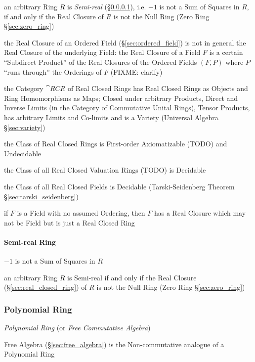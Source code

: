 an arbitrary Ring $R$ is \emph{Semi-real} (\S\ref{sec:semireal_ring}), i.e.
$-1$ is not a Sum of Squares in $R$, if and only if the Real Closure of $R$ is
not the Null Ring (Zero Ring \S\ref{sec:zero_ring})

the Real Closure of an Ordered Field (\S\ref{sec:ordered_field}) is not in
general the Real Closure of the underlying Field: the Real Closure of a Field
$F$ is a certain ``Subdirect Product'' of the Real Closures of the Ordered
Fields $(F,P)$ where $P$ ``runs through'' the Orderings of $F$ (FIXME: clarify)

the Category $\cat{RCR}$ of Real Closed Rings has Real Closed Rings as Objects
and Ring Homomorphisms as Maps; Closed under arbitrary Products, Direct and
Inverse Limits (in the Category of Commutative Unital Rings), Tensor Products,
has arbitrary Limits and Co-limits and is a Variety (Universal Algebra
\S\ref{sec:variety})

the Class of Real Closed Rings is First-order Axiomatizable (TODO) and
Undecidable

the Class of all Real Closed Valuation Rings (TODO) is Decidable

the Class of all Real Closed Fields is Decidable (\fist Tarski-Seidenberg
Theorem \S\ref{sec:tarski_seidenberg})

if $F$ is a Field with no assumed Ordering, then $F$ has a Real Closure which
may not be Field but is just a Real Closed Ring



\paragraph{Semi-real Ring}\label{sec:semireal_ring}\hfill

$-1$ is not a Sum of Squares in $R$

an arbitrary Ring $R$ is Semi-real if and only if the Real Closure
(\S\ref{sec:real_closed_ring}) of $R$ is not the Null Ring (Zero Ring
\S\ref{sec:zero_ring})



\subsubsection{Polynomial Ring}\label{sec:polynomial_ring}

\emph{Polynomial Ring} (or \emph{Free Commutative Algebra})

Free Algebra (\S\ref{sec:free_algebra}) is the Non-commutative
analogue of a Polynomial Ring

